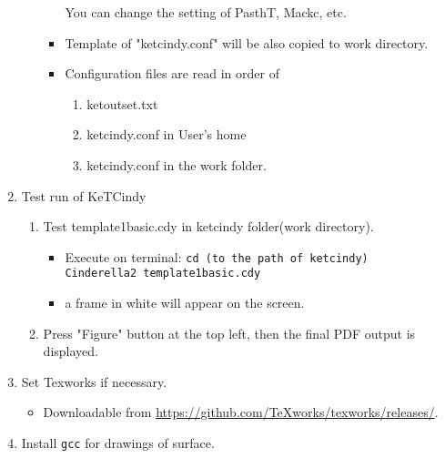 \documentclass{article}
\begin{document}
\begin{enumerate}[\bf\large 1.]
\begin{enumerate}[(1)]
\begin{itemize}
    \hspace*{10mm}You can change the setting of PasthT, Mackc, etc.
    \item Template of "ketcindy.conf" will be also copied to work directory.
    \item Configuration files are read in order of 
      \begin{enumerate}[1)]
      \item ketoutset.txt
      \item ketcindy.conf in User's home
      \item ketcindy.conf in the work folder.
      \end{enumerate}
    \end{itemize}
  \end{enumerate}

\item Test run of KeTCindy
\begin{enumerate}[(1)]
  \item Test template1basic.cdy in ketcindy folder(work directory).
    \begin{itemize}
    \item Execute on terminal:
      \hspace*{10mm}\verb|cd (to the path of ketcindy)|\\
      \hspace*{10mm}\verb|Cinderella2 template1basic.cdy|
    \item a frame in white will appear on the screen.
    \end{itemize}
  \item Press "Figure" button at the top left, then the final PDF output is displayed. 
 \end{enumerate}

\item Set Texworks if necessary. 
  \begin{itemize}
  \item Downloadable from \url{https://github.com/TeXworks/texworks/releases/}.
  \end{itemize}

\item Install \verb|gcc| for drawings of surface.

\end{enumerate}
\end{document}
